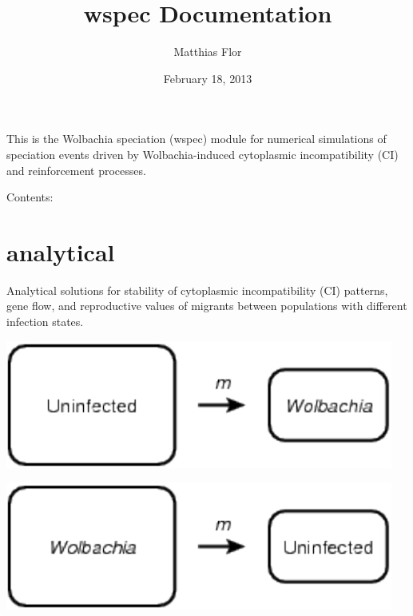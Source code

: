 \documentclass[letterpaper,10pt,english]{sphinxmanual}
\title{wspec Documentation}
\date{February 18, 2013}
\author{Matthias Flor}
\begin{document}
\maketitle
\tableofcontents
{}\label{index::doc}


This is the Wolbachia speciation (wspec) module for numerical
simulations of speciation events driven by Wolbachia-induced
cytoplasmic incompatibility (CI) and reinforcement processes.

Contents:


\chapter{analytical}
\label{index:analytical}\label{index:welcome-to-wspec-s-documentation}
Analytical solutions for stability of cytoplasmic
incompatibility (CI) patterns, gene flow, and reproductive values
of migrants between populations with different infection states.

\includegraphics{uninfected_mainland.pdf}

\includegraphics{infected_mainland.pdf}
\label{index:module-wspec.analytical}\label{index:module-analytical}
\end{document}
